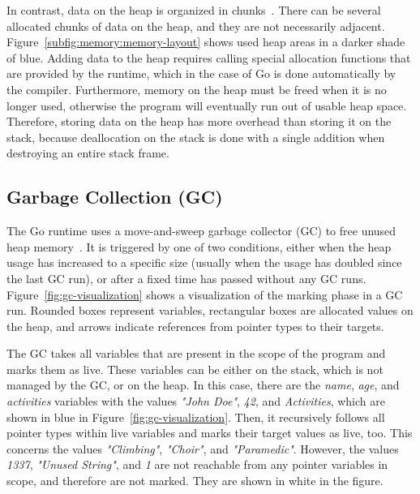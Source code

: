 In contrast, data on the heap is organized in chunks~\cite{ferres2010}.
There can be several allocated chunks of data on the heap, and they are not necessarily adjacent.
Figure~\ref{subfig:memory:memory-layout} shows used heap areas in a darker shade of blue.
Adding data to the heap requires calling special allocation functions that are provided by the runtime, which in the
case of Go is done automatically by the compiler.
Furthermore, memory on the heap must be freed when it is no longer used, otherwise the program will eventually run out
of usable heap space.
Therefore, storing data on the heap has more overhead than storing it on the stack, because deallocation on the stack is
done with a single addition when destroying an entire stack frame.



\subsection{Garbage Collection (GC)}\label{subsec:background:memory:gc}

The Go runtime uses a move-and-sweep garbage collector (\acrshort{GC}) to free unused heap memory~\cite{sibiryov2017}.
It is triggered by one of two conditions, either when the heap usage has increased to a specific size (usually when the
usage has doubled since the last \acrshort{GC} run), or after a fixed time has passed without any \acrshort{GC} runs.
Figure~\ref{fig:gc-visualization} shows a visualization of the marking phase in a \acrshort{GC} run.
Rounded boxes represent variables, rectangular boxes are allocated values on the heap, and arrows indicate references
from pointer types to their targets.



The \acrshort{GC} takes all variables that are present in the scope of the program and marks them as live.
These variables can be either on the stack, which is not managed by the \acrshort{GC}, or on the heap.
In this case, there are the \textit{name}, \textit{age}, and \textit{activities} variables with the values
\textit{"John Doe"}, \textit{42}, and \textit{Activities}, which are shown in blue in Figure~\ref{fig:gc-visualization}.
Then, it recursively follows all pointer types within live variables and marks their target values as live, too.
This concerns the values \textit{"Climbing"}, \textit{"Choir"}, and \textit{"Paramedic"}.
However, the values \textit{1337}, \textit{"Unused String"}, and \textit{1} are not reachable from any pointer variables
in scope, and therefore are not marked.
They are shown in white in the figure.

